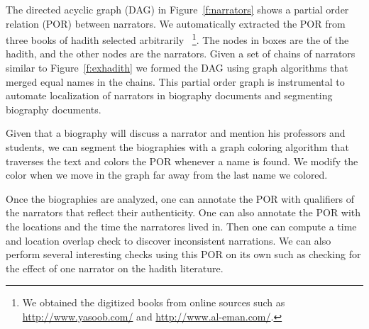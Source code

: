 \documentclass[12pt]{article}
\begin{document}
\begin{figure}[tb]
\end{figure}

The directed acyclic graph (DAG) 
in Figure~\ref{f:narrators} shows a partial order relation (POR) 
between narrators.
We automatically extracted the POR from three books of hadith 
selected arbitrarily~\cite{IbnHanbal,AlKulayni,AlTousi}
\footnote{We obtained
  the digitized books from online sources such as 
  \href{http://www.yasoob.com/}{http://www.yasoob.com/} and 
  \href{http://www.al-eman.com/}{http://www.al-eman.com/}. }.
The nodes in boxes are the  of the hadith, 
and the other nodes are the narrators.
Given a set of chains of narrators similar to 
Figure~\ref{f:exhadith} we formed the DAG using graph algorithms 
that merged equal names in the chains. 
This partial order graph is instrumental to automate
localization of narrators in biography documents and
segmenting biography documents.

Given that a biography will discuss a narrator and mention
his professors and students,
we can segment the biographies with a graph coloring algorithm 
that traverses the text and colors the POR whenever
a name is found. 
We modify the color when we move in the graph 
far away from the last name we colored.

Once the biographies are analyzed, one can annotate
the POR with qualifiers of the narrators that reflect
their authenticity. 
One can also annotate the POR with the locations and 
the time the narratores lived in. 
Then one can compute a time and location overlap
check to discover inconsistent narrations.
We can also perform several interesting checks using 
this POR on its own such as checking for the effect of
one narrator on the hadith literature. 
\end{document}
